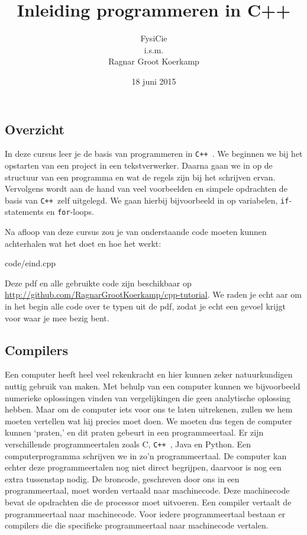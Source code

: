 \documentclass[12pt,a4paper]{article}
\title{Inleiding programmeren in C++}
\author{
FysiCie\\
i.s.m.\\
Ragnar Groot Koerkamp
}
\date{18 juni 2015}
\newcommand{\code}{}
\newcommand{\icode}{\lstinline}
\newcommand{\mono}{\texttt}
\newcommand{\cpp}{\mono{C++ }}
\begin{document}
 
\maketitle

\tableofcontents

\clearpage
\subsection{Overzicht}
In deze cursus leer je de basis van programmeren in \cpp. We beginnen we bij het opstarten van een project in een tekstverwerker. Daarna gaan we in op de structuur van een programma en wat de regels zijn bij het schrijven ervan. Vervolgens wordt aan de hand van veel voorbeelden en simpele opdrachten de basis van \cpp zelf	 uitgelegd. We gaan hierbij bijvoorbeeld in op variabelen, \icode{if}-statements en \icode{for}-loops.

Na afloop van deze cursus zou je van onderstaande code moeten kunnen achterhalen wat het doet en hoe het werkt:

\code{code/eind.cpp}

Deze pdf en alle gebruikte code zijn beschikbaar op \url{http://github.com/RagnarGrootKoerkamp/cpp-tutorial}. We raden je echt aar om in het begin alle code over te typen uit de pdf, zodat je echt een gevoel krijgt voor waar je mee bezig bent.

\subsection{Compilers}
Een computer heeft heel veel rekenkracht en hier kunnen zeker natuurkundigen nuttig gebruik van maken. Met behulp van een computer kunnen we bijvoorbeeld numerieke oplossingen vinden van vergelijkingen die geen analytische oplossing hebben. Maar om de computer iets voor ons te laten uitrekenen, zullen we hem moeten vertellen wat hij precies moet doen. We moeten dus tegen de computer kunnen `praten,' en dit praten gebeurt in een programmeertaal. Er zijn verschillende programmeertalen zoals C, \cpp, Java en Python. Een computerprogramma schrijven we in zo'n programmeertaal. De computer kan echter deze programmeertalen nog niet direct begrijpen, daarvoor is nog een extra tussenstap nodig. De broncode, geschreven door ons in een programmeertaal, moet worden vertaald naar machinecode. Deze machinecode bevat de opdrachten die de processor moet uitvoeren. Een compiler vertaalt de programmeertaal naar machinecode. Voor iedere programmeertaal bestaan er compilers die die specifieke programmeertaal naar machinecode vertalen.
\end{document}
